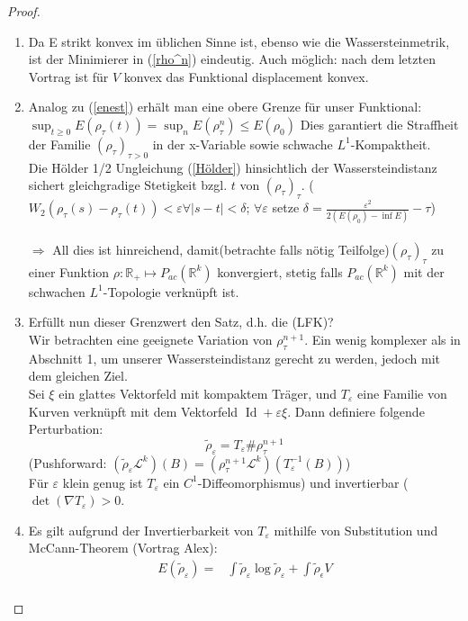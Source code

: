 \documentclass[11pt,a4paper,notitlepage]{scrreprt}
\newcommand{\RR}{\mathbb{R}}
\begin{document}
\begin{proof}
\begin{enumerate}
\item Da E strikt konvex im üblichen Sinne ist, ebenso wie die Wassersteinmetrik, ist der Minimierer in (\ref{rho^n})  eindeutig. Auch möglich: nach dem letzten Vortrag ist für $V$ konvex das Funktional displacement konvex. 
\item Analog zu (\ref{enest}) erhält man eine obere Grenze für unser Funktional: $\sup_{t\geq 0} E(\rho_\tau(t))=\sup_n E(\rho_\tau^n)\leq E(\rho_0)$
Dies garantiert die Straffheit der Familie $(\rho_\tau)_{\tau >0}$ in der x-Variable sowie schwache $L^1$-Kompaktheit.\\
Die Hölder 1/2 Ungleichung (\ref{Hölder}) hinsichtlich der Wassersteindistanz sichert gleichgradige Stetigkeit bzgl. $t$ von $(\rho_\tau)_\tau$. ($W_2(\rho_\tau(s)-\rho_\tau(t))<\varepsilon \forall \vert s-t\vert<\delta$; $\forall \varepsilon$ setze $\delta=\frac{\varepsilon^2}{2(E(\rho_0)-\inf E)}-\tau$)\\\\
$\Rightarrow$ All dies ist hinreichend, damit(betrachte falls nötig Teilfolge)$(\rho_\tau)_\tau$ zu einer Funktion $\rho: \RR_+ \mapsto P_{ac}(\RR^k)$ konvergiert, stetig falls $P_{ac}(\RR^k)$ mit der schwachen $L^1$-Topologie verknüpft ist. \\
\item Erfüllt nun dieser Grenzwert den Satz, d.h. die (LFK)? \\
Wir betrachten eine geeignete Variation von $\rho_\tau^{n+1}$. Ein wenig komplexer als in Abschnitt 1, um unserer Wassersteindistanz gerecht zu werden, jedoch mit dem gleichen Ziel.\\
Sei $\xi$ ein glattes Vektorfeld mit kompaktem Träger, und $T_\varepsilon$ eine Familie von Kurven verknüpft mit dem Vektorfeld $\operatorname{Id} +\varepsilon\xi$. Dann definiere folgende Perturbation:
\[\tilde{\rho}_\varepsilon=T_\varepsilon \#\rho_\tau^{n+1} \]
(Pushforward: $(\tilde{\rho}_\varepsilon \mathcal{L}^k)(B)=(\rho_\tau^{n+1}\mathcal{L}^k)(T_\varepsilon^{-1}(B))$)\\
Für $\varepsilon$ klein genug ist $T_\varepsilon$ ein $C^1$-Diffeomorphismus) und invertierbar ($\det(\nabla T_\varepsilon)>0$.\\
\item Es gilt aufgrund der Invertierbarkeit von $T_\varepsilon$ mithilfe von Substitution und McCann-Theorem (Vortrag Alex):  
\begin{align}
E(\tilde{\rho}_\varepsilon)=&\int\tilde{\rho}_\varepsilon\log\tilde{\rho}_\varepsilon+\int\tilde{\rho}_\epsilon V\\

\end{align}
\end{enumerate}
\end{proof}
\end{document}
